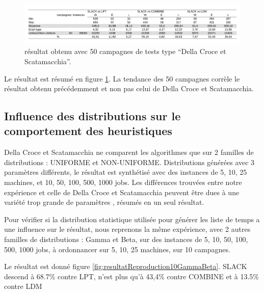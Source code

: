 \documentclass[a4paper,12pt]{report}
\theoremstyle{plain}				%
\theoremstyle{definition}				%
\begin{document}
\begin{figure}
{\centering
\includegraphics[width=\columnwidth]{4_Resultat_Reproduction50DCS.pdf}
\caption{résultat obtenu avec 50 campagnes de tests type ``Della Croce et Scatamacchia''.}
\label{fig:resultatReproduction50DellaCroceScatamacchia}
\par}
\end{figure}

Le résultat est résumé en figure \ref{fig:resultatReproduction50DellaCroceScatamacchia}. 
La tendance des 50 campagnes corrèle le résultat obtenu précédemment et non pas 
  celui de Della Croce et Scatamacchia.

\subsection{Influence des distributions sur le comportement des heuristiques}
\label{ssec:resultatsInfluenceDesDistributionSurLeComportement}


Della Croce et Scatamacchia ne comparent les algorithmes que sur 2 familles de distributions : 
UNIFORME et NON-UNIFORME. Distributions générées avec 3 paramètres différents, le résultat est synthétisé avec des instances de 5, 10, 25 machines, et 10, 50, 100, 500, 1000 jobs. 
Les différences trouvées entre notre expérience et celle de Della Croce et Scatamacchia peuvent 
être dues à une variété trop grande de paramètres , résumés en un seul résultat.

\bigskip
Pour vérifier si la distribution statistique utilisée pour générer les liste de temps 
  a une influence sur le résultat, 
  nous reprenons la même expérience, avec 2 autres familles de distributions : 
  Gamma et Beta,
  sur des instances de 5, 10, 50, 100, 500, 1000 jobs, 
  à ordonnancer sur 5, 10, 25 machines,
  sur 10 campagnes.

Le résultat est donné figure \ref{fig:resultatReproduction10GammaBeta}.
SLACK descend à 68.7\% contre LPT, 
n'est plus qu'à 43,4\% contre COMBINE et
à 13.5\% contre LDM
   
\end{document}
